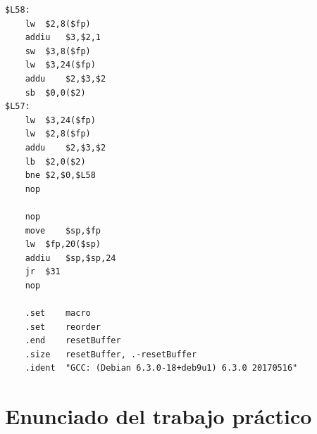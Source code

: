\documentclass[titlepage,a4paper]{article}
\begin{document}
\begin{lstlisting}[style=custom_mips]
$L58:
	lw	$2,8($fp)
	addiu	$3,$2,1
	sw	$3,8($fp)
	lw	$3,24($fp)
	addu	$2,$3,$2
	sb	$0,0($2)
$L57:
	lw	$3,24($fp)
	lw	$2,8($fp)
	addu	$2,$3,$2
	lb	$2,0($2)
	bne	$2,$0,$L58
	nop

	nop
	move	$sp,$fp
	lw	$fp,20($sp)
	addiu	$sp,$sp,24
	jr	$31
	nop

	.set	macro
	.set	reorder
	.end	resetBuffer
	.size	resetBuffer, .-resetBuffer
	.ident	"GCC: (Debian 6.3.0-18+deb9u1) 6.3.0 20170516"
\end{lstlisting}

\newpage
\section{Enunciado del trabajo práctico}
% 

\newpage
\end{document}
